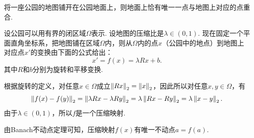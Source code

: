 \begin{example}[落在地面上的地图]
将一座公园的地图铺开在公园地面上，则地面上恰有唯一一点与地图上对应的点重合. 

设公园可以用有界的闭区域$\Omega$表示. 设地图的压缩比是$\lambda\in(0,1)$. 现在固定一个平面直角坐标系，把地图铺在区域$\Omega$内，则从$\Omega$内的点$x$（公园中的地点）到地图上对应点$x'$的变换由下面的公式给出：
\[x' = f(x) = \lambda Rx + b.\]
其中$R$和$b$分别为旋转和平移变换. 

根据旋转的定义，对任意$x\in\Omega$成立$\left\|Rx\right\|_2=\left\|x\right\|_2$，因此所以对任意$x,y\in\Omega$，有
\[\left\|f(x)-f(y)\right\|_2=\left\|\lambda Rx-\lambda Ry\right\|_2=\lambda\left\|Rx-Ry\right\|_2= \lambda\left\|x-y\right\|_2.\]
由于$\lambda\in(0,1)$，所以$f$是一个压缩映射.

由Banach不动点定理可知，压缩映射$f(x)$有唯一不动点$a=f(a)$.
\end{example}


